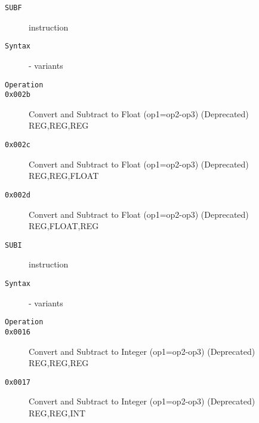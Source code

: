 \begin{description}
\item[\texttt{SUBF}] instruction\\
\item[\texttt{Syntax}] - variants\\

\item[\texttt{Operation}]
\item[\texttt{}]
\item[\texttt{0x002b}] Convert and Subtract to Float (op1=op2-op3) (Deprecated)  {REG,REG,REG}       \\
\item[\texttt{0x002c}] Convert and Subtract to Float (op1=op2-op3) (Deprecated)  {REG,REG,FLOAT}     \\
\item[\texttt{0x002d}] Convert and Subtract to Float (op1=op2-op3) (Deprecated)  {REG,FLOAT,REG}     \\
\end{description}
\clearpage
\begin{description}
\item[\texttt{SUBI}] instruction\\
\item[\texttt{Syntax}] - variants\\

\item[\texttt{Operation}]
\item[\texttt{}]
\item[\texttt{0x0016}] Convert and Subtract to Integer (op1=op2-op3) (Deprecated)  {REG,REG,REG}       \\
\item[\texttt{0x0017}] Convert and Subtract to Integer (op1=op2-op3) (Deprecated)  {REG,REG,INT}       \\
\end{description}
\clearpage
